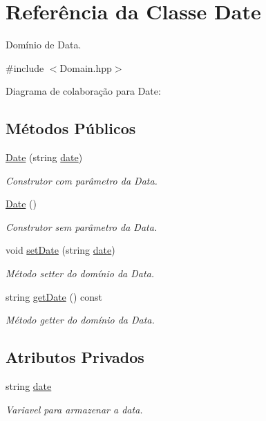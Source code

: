\hypertarget{classDate}{}\section{Referência da Classe Date}
\label{classDate}


Domínio de Data.  




{\ttfamily \#include $<$Domain.\+hpp$>$}



Diagrama de colaboração para Date\+:
\subsection*{Métodos Públicos}
\begin{DoxyCompactItemize}
\item 
\hyperlink{classDate_a5532efafed41fd5f8e013a61313200dc}{Date} (string \hyperlink{classDate_a8ffcd034623f1a4eac1b86aadfa3133d}{date})
\begin{DoxyCompactList}\small\item\em Construtor com parâmetro da Data. \end{DoxyCompactList}\item 
\hyperlink{classDate_a4e59ed4ba66eec61c27460c5d09fa1bd}{Date} ()
\begin{DoxyCompactList}\small\item\em Construtor sem parâmetro da Data. \end{DoxyCompactList}\item 
void \hyperlink{classDate_abbd3c22e63d9fb3fbb1a34e5614aab22}{set\+Date} (string \hyperlink{classDate_a8ffcd034623f1a4eac1b86aadfa3133d}{date})
\begin{DoxyCompactList}\small\item\em Método setter do domínio da Data. \end{DoxyCompactList}\item 
string \hyperlink{classDate_a5d6497b6ae42071efff693e6ff3881a1}{get\+Date} () const 
\begin{DoxyCompactList}\small\item\em Método getter do domínio da Data. \end{DoxyCompactList}\end{DoxyCompactItemize}
\subsection*{Atributos Privados}
\begin{DoxyCompactItemize}
\item 
string \hyperlink{classDate_a8ffcd034623f1a4eac1b86aadfa3133d}{date}\hypertarget{classDate_a8ffcd034623f1a4eac1b86aadfa3133d}{}\label{classDate_a8ffcd034623f1a4eac1b86aadfa3133d}

\begin{DoxyCompactList}\small\item\em Variavel para armazenar a data. \end{DoxyCompactList}\end{DoxyCompactItemize}



